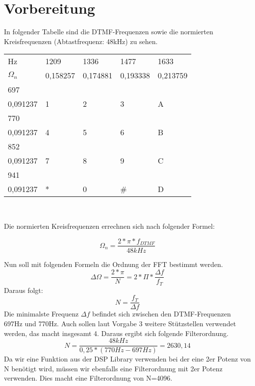 \chapter{Vorbereitung}

In folgender Tabelle sind die DTMF-Frequenzen sowie die normierten Kreisfrequenzen (Abtastfrequenz: 48kHz) zu sehen.\\

\begin{table}[H]
	
\centering
\begin{tabular}{l|l|l|l|l}
	Hz & 1209 & 1336 & 1477 & 1633 \\
	\begin{math}\Omega_n\end{math}  & 0,158257 & 0,174881 & 0,193338 & 0,213759\\
	\hline\hline 
	697 & & & & \\
	0,091237 & 1 & 2 & 3 & A \\
	\hline
	770 & & & & \\
	0,091237 & 4 & 5 & 6 & B \\
	\hline
	852 & & & & \\
	0,091237 & 7 & 8 & 9 & C \\
	\hline
	941 & & & & \\
	0,091237 & * & 0 & \# & D \\
	\hline
\end{tabular}\\
\end{table}

Die normierten Kreisfrequenzen errechnen sich nach folgender Formel:


\begin{equation}
  \Omega_n=\frac{2*\pi*f_{DTMF}}{48kHz}
\end{equation}

Nun soll mit folgenden Formeln die Ordnung der FFT bestimmt werden. 
\begin{equation}
  \Delta\Omega=\frac{2*\pi}{N}=2*\Pi*\frac{\Delta f}{f_T}
\end{equation}
Daraus folgt:
\begin{equation}
  N=\frac{f_T}{\Delta f}
\end{equation}
Die minimalste Frequenz \begin{math}\Delta f\end{math} befindet sich zwischen den DTMF-Frequenzen 697Hz und 770Hz.
Auch sollen laut Vorgabe 3 weitere St\"utzstellen verwendet werden, das macht insgesamt 4.
Daraus ergibt sich folgende Filterordnung.
\begin{equation}
  N=\frac{48kHz}{0,25*(770Hz-697Hz)}=2630,14
\end{equation}
Da wir eine Funktion aus der DSP Library verwenden bei der eine 2er Potenz von N ben\"otigt wird, m\"ussen wir ebenfalls eine Filterordnung mit 2er Potenz verwenden.
Dies macht eine Filterordnung von N=4096.